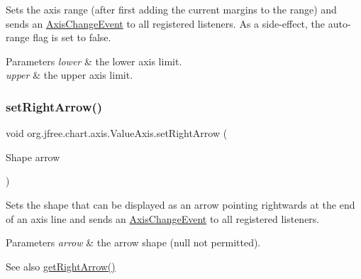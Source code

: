 Sets the axis range (after first adding the current margins to the range) and sends an \mbox{\hyperlink{}{Axis\+Change\+Event}} to all registered listeners. As a side-\/effect, the auto-\/range flag is set to {\ttfamily false}.


\begin{DoxyParams}{Parameters}
{\em lower} & the lower axis limit. \\
\hline
{\em upper} & the upper axis limit. \\
\hline
\end{DoxyParams}
\mbox{\label{classorg_1_1jfree_1_1chart_1_1axis_1_1_value_axis_a8d44ab4ca98d13a775770b10de454825}} 
\subsubsection{\texorpdfstring{set\+Right\+Arrow()}{setRightArrow()}}
{\footnotesize\ttfamily void org.\+jfree.\+chart.\+axis.\+Value\+Axis.\+set\+Right\+Arrow (\begin{DoxyParamCaption}\item[{Shape}]{arrow }\end{DoxyParamCaption})}

Sets the shape that can be displayed as an arrow pointing rightwards at the end of an axis line and sends an \mbox{\hyperlink{}{Axis\+Change\+Event}} to all registered listeners.


\begin{DoxyParams}{Parameters}
{\em arrow} & the arrow shape ({\ttfamily null} not permitted).\\
\hline
\end{DoxyParams}
\begin{DoxySeeAlso}{See also}
\mbox{\hyperlink{classorg_1_1jfree_1_1chart_1_1axis_1_1_value_axis_a5a1a077afd417597a208df17e1e6410f}{get\+Right\+Arrow()}} 
\end{DoxySeeAlso}
\mbox{\label{classorg_1_1jfree_1_1chart_1_1axis_1_1_value_axis_ac84e1ffa28cdea7b355306ae472d21a2}} 
